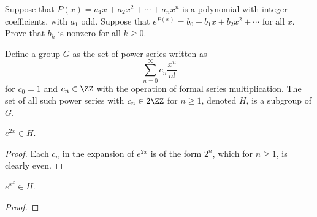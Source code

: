 \documentclass[11pt]{scrartcl}
\begin{document}
\begin{mdframed}[style=mdpurplebox,frametitle={Problem Statement}]
    Suppose that $P(x) = a_{1}x + a_{2}x^{2} + \cdots + a_{n}x^{n}$ is a polynomial with integer coefficients, with $a_{1}$ odd. Suppose that $e^{P(x)} = b_{0} + b_{1}x + b_{2}x^{2} + \cdots$ for all $x$. Prove that $b_{k}$ is nonzero for all $k \geq 0$.
\end{mdframed}

Define a group $G$ as the set of power series written as
\[\sum_{n = 0}^{\infty}c_{n}\frac{x^{n}}{n!}\]
for $c_{0} = 1$ and $c_{n} \in \ZZ$ with the operation of formal series multiplication. The set of all such power series with $c_{n} \in 2\ZZ$ for $n \geq 1$, denoted $H$, is a subgroup of $G$.

\begin{claim*}
    $e^{2x} \in H$.
\end{claim*}
\begin{proof}
    Each $c_{n}$ in the expansion of $e^{2x}$ is of the form $2^{n}$, which for $n \geq 1$, is clearly even.
\end{proof}

\begin{claim*}
    $e^{x^{k}} \in H$.
\end{claim*}
\begin{proof}
    
\end{proof}
\end{document}
